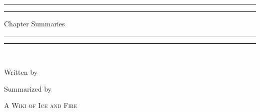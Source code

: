 \begin{titlepage}
\centering
\scshape
\vspace*{\baselineskip}

\rule{\textwidth}{1.6pt}\vspace*{-\baselineskip}\vspace*{2pt} 
\rule{\textwidth}{0.4pt}
\vspace{0.75\baselineskip}

{\HUGE\thetitle}
\vspace{1.5\baselineskip}

{\Huge Chapter Summaries}

\vspace{0.75\baselineskip}
\rule{\textwidth}{0.4pt}\vspace*{-\baselineskip}\vspace{3.2pt}
\rule{\textwidth}{1.6pt}
\vspace{\baselineskip}

\Large \bookxof\\
\huge{\textbf{\bookseries}}
\vspace{2\baselineskip}

\Large Written by
\vspace{0.25\baselineskip}

{\scshape\huge\theauthor}
\vspace{3\baselineskip}

\Large Summarized by
\vspace{0.25\baselineskip}

{\scshape\huge A Wiki of Ice and Fire}
\vfill
\end{titlepage}
